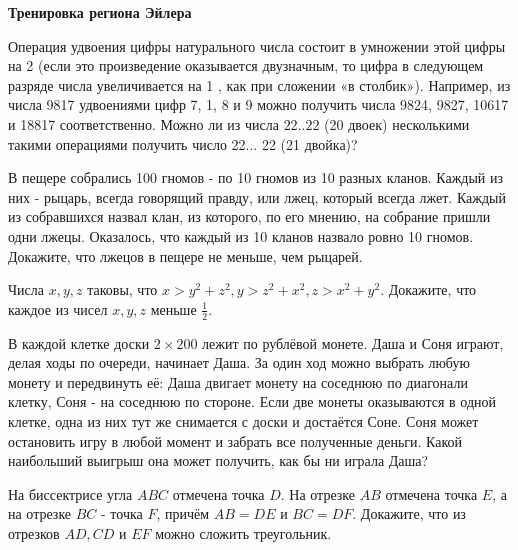 \centerline{\bf \Huge Тренировка региона Эйлера}

\begin{flushright}
        \scriptsize{}
\end{flushright}

Операция удвоения цифры натурального числа состоит в умножении этой цифры на 2 (если это произведение оказывается двузначным, то цифра в следующем разряде числа увеличивается на 1 , как при сложении «в столбик»). Например, из числа 9817 удвоениями цифр 7, 1, 8 и 9 можно получить числа 9824, 9827, 10617 и 18817 соответственно. Можно ли из числа $22 . .22$ (20 двоек) несколькими такими операциями получить число 22... 22 (21 двойка)?


В пещере собрались 100 гномов - по 10 гномов из 10 разных кланов. Каждый из них - рыцарь, всегда говорящий правду, или лжец, который всегда лжет. Каждый из собравшихся назвал клан, из которого, по его мнению, на собрание пришли одни лжецы. Оказалось, что каждый из 10 кланов назвало ровно 10 гномов. Докажите, что лжецов в пещере не меньше, чем рыцарей.

Числа $x, y, z$ таковы, что $x>y^2+z^2, y>z^2+x^2, z>x^2+y^2$. Докажите, что каждое из чисел $x, y, z$ меньше $\frac{1}{2}$.

В каждой клетке доски $2 \times 200$ лежит по рублёвой монете. Даша и Соня играют, делая ходы по очереди, начинает Даша. За один ход можно выбрать любую монету и передвинуть её: Даша двигает монету на соседнюю по диагонали клетку, Соня - на соседнюю по стороне. Если две монеты оказываются в одной клетке, одна из них тут же снимается с доски и достаётся Соне. Соня может остановить игру в любой момент и забрать все полученные деньги. Какой наибольший выигрыш она может получить, как бы ни играла Даша?

На биссектрисе угла $A B C$ отмечена точка $D$. На отрезке $A B$ отмечена точка $E$, а на отрезке $B C$ - точка $F$, причём $A B=D E$ и $B C=D F$. Докажите, что из отрезков $A D, C D$ и $E F$ можно сложить треугольник.